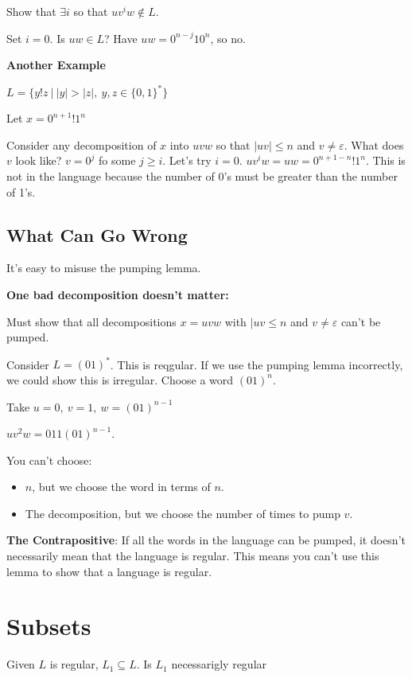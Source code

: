 \documentclass[12pt]{article}
\begin{document}
Show that $\exists i$ so that $uv^iw \notin L$.

Set $i=0$. Is $uw \in L$? Have $uw=0^{n-j}10^n$, so no.

\textbf{Another Example}

$L = \{y!z \ |\ |y| >|z|,\ y,z \in \{0,1\}^* \}$

Let $x = 0^{n+1}!1^n$

Consider any decomposition of $x$ into $uvw$ so that $|uv| \leq n $ and $v \neq
\varepsilon$. What does $v$ look like? $v = 0^j$ fo some $j\geq i$. Let's try
$i=0$. $uv^iw = uw = 0^{n+1-n}!1^n$. This is not in the language because the
number of 0's must be greater than the number of 1's.

\subsection{What Can Go Wrong}

It's easy to misuse the pumping lemma.

\textbf{One bad decomposition doesn't matter:}

Must show that all decompositions $x = uvw$ with $|uv \leq n$ and $v \neq
\varepsilon$ can't be pumped.

Consider $L = (01)^*$. This is reqgular. If we use the pumping lemma
incorrectly, we could show this is irregular. Choose a word $(01)^n$.

Take $u=0,\ v=1,\ w=(01)^{n-1}$

$uv^2w = 011(01)^{n-1}$.

You can't choose:
\begin{itemize}
	\item $n$, but we choose the word in terms of $n$.
	\item The decomposition, but we choose the number of times to pump $v$.
\end{itemize}

\textbf{The Contrapositive}: If all the words in the language can be pumped, it
doesn't necessarily mean that the language is regular. This means you can't use
this lemma to show that a language is regular.

\section{Subsets}

Given $L$ is regular, $L_1 \subseteq L$. Is $L_1$ necessarigly regular
\end{document}
